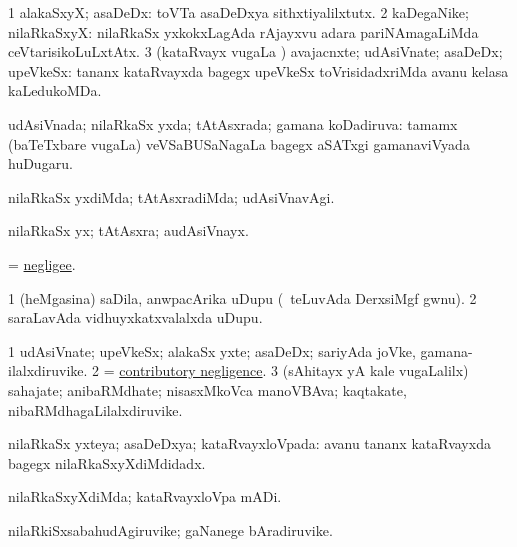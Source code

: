 \bentry
{}
\gl{\nA}
\bmng
\bnum
\num{1} alakaSxyX; asaDeDx:  toVTa asaDeDxya sithxtiyalilxtutx. 
\num{2} kaDegaNike; nilaRkaSxyX:  nilaRkaSx yxkokxLagAda rAjayxvu adara pariNAmagaLiMda ceVtarisikoLuLxtAtx. 
\num{3} (kataRvayx \mo vugaLa \vi) avajacnxte; udAsiVnate; asaDeDx; upeVkeSx:  tananx kataRvayxda bagegx upeVkeSx toVrisidadxriMda avanu kelasa kaLedukoMDa. 
\enum
\emng
\eentry

\bentry
{}
\gl{\gu}
\bmng
udAsiVnada; nilaRkaSx yxda; tAtAsxrada; gamana koDadiruva:  tamamx (baTeTxbare \mo vugaLa) veVSaBUSaNagaLa bagegx aSATxgi gamanaviVyada huDugaru. 
\emng
\eentry

\bentry
{}
\gl{\kirxvi}
\bmng
nilaRkaSx yxdiMda; tAtAsxradiMda; udAsiVnavAgi. 
\emng
\eentry

\bentry
{}
\gl{\nA}
\bmng
nilaRkaSx yx; tAtAsxra; audAsiVnayx. 
\emng
\eentry

\bentry
{}
\gl{\nA}
\bmng
= \hyperlink{negligee}{negligee}. 
\emng
\eentry

\bentry
{}
\gl{\nA}
\bmng
\bnum
\num{1} (heMgasina) saDila, anwpacArika uDupu (\kanmu\ teLuvAda DerxsiMgf gwnu). 
\num{2} saraLavAda vidhuyxkatxvalalxda uDupu. 
\enum
\emng
\eentry

\bentry
{}
\gl{\nA}
\bmng
\bnum
\num{1} udAsiVnate; upeVkeSx; alakaSx yxte; asaDeDx; sariyAda joVke, gamana-ilalxdiruvike. 
\num{2} = \hyperref{kandict_c.pdf}{C}{contributory negligence}{contributory negligence}. 
\num{3} (sAhitayx yA kale \mo vugaLalilx) sahajate; anibaRMdhate; nisasxMkoVca manoVBAva; kaqtakate, nibaRMdhagaLilalxdiruvike. 
\enum
\emng
\eentry

\bentry
{}
\gl{\gu}
\bmng
nilaRkaSx yxteya; asaDeDxya; kataRvayxloVpada:  avanu tananx kataRvayxda bagegx nilaRkaSxyXdiMdidadx. 
\emng
\eentry

\bentry
{}
\gl{\kirxvi}
\bmng
nilaRkaSxyXdiMda; kataRvayxloVpa mADi. 
\emng
\eentry

\bentry
{}
\gl{\nA}
\bmng
nilaRkiSxsabahudAgiruvike; gaNanege bAradiruvike. 
\emng
\eentry

